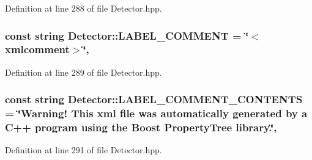 Definition at line 288 of file Detector.\-hpp.

\hypertarget{classmultiscale_1_1analysis_1_1Detector_a561d5a58b94e4ccce28726c98f6ca71e}{
\subsubsection[{L\-A\-B\-E\-L\-\_\-\-C\-O\-M\-M\-E\-N\-T}]{\setlength{\rightskip}{0pt plus 5cm}const string Detector\-::\-L\-A\-B\-E\-L\-\_\-\-C\-O\-M\-M\-E\-N\-T = \char`\"{}$<$xmlcomment$>$\char`\"{}\hspace{0.3cm}{\ttfamily [static]}, {\ttfamily [protected]}}}\label{classmultiscale_1_1analysis_1_1Detector_a561d5a58b94e4ccce28726c98f6ca71e}


Definition at line 289 of file Detector.\-hpp.

\hypertarget{classmultiscale_1_1analysis_1_1Detector_adf6527cf12c5267d28210a0a60ce43cf}{
\subsubsection[{L\-A\-B\-E\-L\-\_\-\-C\-O\-M\-M\-E\-N\-T\-\_\-\-C\-O\-N\-T\-E\-N\-T\-S}]{\setlength{\rightskip}{0pt plus 5cm}const string Detector\-::\-L\-A\-B\-E\-L\-\_\-\-C\-O\-M\-M\-E\-N\-T\-\_\-\-C\-O\-N\-T\-E\-N\-T\-S = \char`\"{}Warning! This xml file was automatically generated by a C++ program using the Boost Property\-Tree library.\char`\"{}\hspace{0.3cm}{\ttfamily [static]}, {\ttfamily [protected]}}}\label{classmultiscale_1_1analysis_1_1Detector_adf6527cf12c5267d28210a0a60ce43cf}


Definition at line 291 of file Detector.\-hpp.

